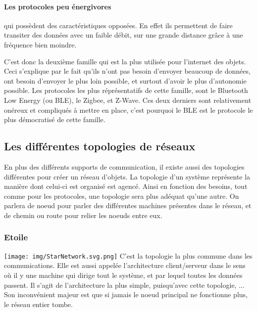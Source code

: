 \paragraph{Les protocoles peu énergivores}qui possèdent des caractéristiques opposées. En effet ils 
permettent de faire transiter des données avec un faible débit, sur une grande distance grâce à une fréquence 
bien moindre.

C'est donc la deuxième famille qui est la plus utilisée pour l'internet des objets. Ceci s'explique par le 
fait qu'ils n'ont pas besoin d'envoyer beaucoup de données, ont besoin d'envoyer le plus loin possible, et 
surtout d'avoir le plus d'autonomie possible. Les protocoles les plus réprésentatifs de cette famille, sont le 
Bluetooth Low Energy (ou BLE), le Zigbee, et Z-Wave. Ces deux derniers sont relativement onéreux et compliqués 
à mettre en place, c'est pourquoi le BLE est le protocole le plus démocratisé de cette famille.

	\subsection{Les différentes topologies de réseaux}
En plus des différents supports de communication, il existe aussi des topologies différentes pour créer un 
réseau d'objets. La topologie d'un système représente la manière dont celui-ci est organisé est agencé. Ainsi 
en fonction des besoins, tout comme pour les protocoles, une topologie sera plus adéquat qu'une autre. On 
parlera de noeud pour parler des différentes machines présentes dans le réseau, et de chemin ou route pour 
relier les noeuds entre eux.

	    \subsubsection{Etoile}
\texttt{[image: img/StarNetwork.svg.png]}
C'est la topologie la plus commune dans les communications. Elle est aussi appelée l'architecture 
client/serveur dans le sens où il y une machine qui dirige tout le système, et par lequel toutes les données 
passent. Il s'agit de l'architecture la plus simple, puisqu'avec cette topologie,  ... Son inconvénient 
majeur est que si jamais le noeud principal ne fonctionne plus, le réseau entier tombe.

